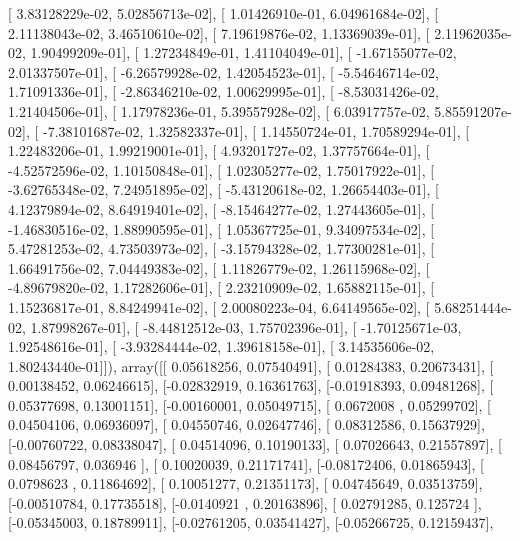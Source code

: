 \documentclass{article}
\begin{document}
       [  3.83128229e-02,   5.02856713e-02],
       [  1.01426910e-01,   6.04961684e-02],
       [  2.11138043e-02,   3.46510610e-02],
       [  7.19619876e-02,   1.13369039e-01],
       [  2.11962035e-02,   1.90499209e-01],
       [  1.27234849e-01,   1.41104049e-01],
       [ -1.67155077e-02,   2.01337507e-01],
       [ -6.26579928e-02,   1.42054523e-01],
       [ -5.54646714e-02,   1.71091336e-01],
       [ -2.86346210e-02,   1.00629995e-01],
       [ -8.53031426e-02,   1.21404506e-01],
       [  1.17978236e-01,   5.39557928e-02],
       [  6.03917757e-02,   5.85591207e-02],
       [ -7.38101687e-02,   1.32582337e-01],
       [  1.14550724e-01,   1.70589294e-01],
       [  1.22483206e-01,   1.99219001e-01],
       [  4.93201727e-02,   1.37757664e-01],
       [ -4.52572596e-02,   1.10150848e-01],
       [  1.02305277e-02,   1.75017922e-01],
       [ -3.62765348e-02,   7.24951895e-02],
       [ -5.43120618e-02,   1.26654403e-01],
       [  4.12379894e-02,   8.64919401e-02],
       [ -8.15464277e-02,   1.27443605e-01],
       [ -1.46830516e-02,   1.88990595e-01],
       [  1.05367725e-01,   9.34097534e-02],
       [  5.47281253e-02,   4.73503973e-02],
       [ -3.15794328e-02,   1.77300281e-01],
       [  1.66491756e-02,   7.04449383e-02],
       [  1.11826779e-02,   1.26115968e-02],
       [ -4.89679820e-02,   1.17282606e-01],
       [  2.23210909e-02,   1.65882115e-01],
       [  1.15236817e-01,   8.84249941e-02],
       [  2.00080223e-04,   6.64149565e-02],
       [  5.68251444e-02,   1.87998267e-01],
       [ -8.44812512e-03,   1.75702396e-01],
       [ -1.70125671e-03,   1.92548616e-01],
       [ -3.93284444e-02,   1.39618158e-01],
       [  3.14535606e-02,   1.80243440e-01]]), array([[ 0.05618256,  0.07540491],
       [ 0.01284383,  0.20673431],
       [ 0.00138452,  0.06246615],
       [-0.02832919,  0.16361763],
       [-0.01918393,  0.09481268],
       [ 0.05377698,  0.13001151],
       [-0.00160001,  0.05049715],
       [ 0.0672008 ,  0.05299702],
       [ 0.04504106,  0.06936097],
       [ 0.04550746,  0.02647746],
       [ 0.08312586,  0.15637929],
       [-0.00760722,  0.08338047],
       [ 0.04514096,  0.10190133],
       [ 0.07026643,  0.21557897],
       [ 0.08456797,  0.036946  ],
       [ 0.10020039,  0.21171741],
       [-0.08172406,  0.01865943],
       [ 0.0798623 ,  0.11864692],
       [ 0.10051277,  0.21351173],
       [ 0.04745649,  0.03513759],
       [-0.00510784,  0.17735518],
       [-0.0140921 ,  0.20163896],
       [ 0.02791285,  0.125724  ],
       [-0.05345003,  0.18789911],
       [-0.02761205,  0.03541427],
       [-0.05266725,  0.12159437],
\end{document}
